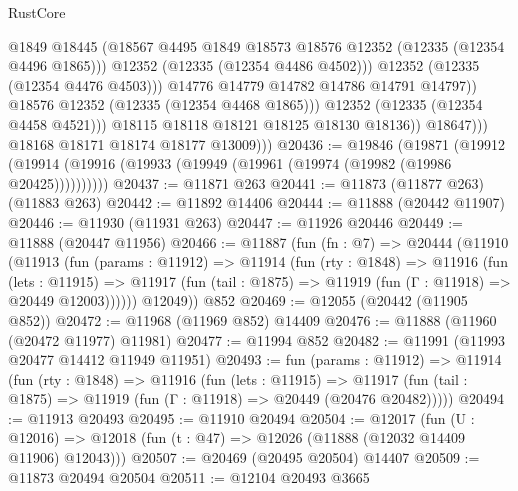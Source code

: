 \begin{lexlean}{RustCore}
\begin{coremodule}
                                @1849
                                @18445
                                (@18567
                                  @4495
                                  @1849
                                  @18573
                                  @18576
                                  @12352
                                  (@12335 (@12354 @4496 @1865)))
                                @12352
                                (@12335 (@12354 @4486 @4502)))
                              @12352
                              (@12335 (@12354 @4476 @4503)))
                            @14776
                            @14779
                            @14782
                            @14786
                            @14791
                            @14797))
                        @18576
                        @12352
                        (@12335 (@12354 @4468 @1865)))
                      @12352
                      (@12335 (@12354 @4458 @4521)))
                    @18115
                    @18118
                    @18121
                    @18125
                    @18130
                    @18136))
                @18647)))
          @18168
          @18171
          @18174
          @18177
          @13009)))
@20436 := @19846
    (@19871 (@19912 (@19914 (@19916 (@19933 (@19949 (@19961 (@19974 (@19982 (@19986 @20425))))))))))
@20437 := @11871 @263
@20441 := @11873 (@11877 @263) (@11883 @263)
@20442 := @11892 @14406
@20444 := @11888 (@20442 @11907)
@20446 := @11930 (@11931 @263)
@20447 := @11926 @20446
@20449 := @11888 (@20447 @11956)
@20466 := @11887
    (fun (fn : @7) =>
    @20444
      (@11910
        (@11913
          (fun (params : @11912) =>
          @11914
            (fun (rty : @1848) =>
            @11916
              (fun (lets : @11915) =>
              @11917 (fun (tail : @1875) => @11919 (fun (Γ : @11918) => @20449 @12003))))))
        @12049))
    @852
@20469 := @12055 (@20442 (@11905 @852))
@20472 := @11968 (@11969 @852) @14409
@20476 := @11888 (@11960 (@20472 @11977) @11981)
@20477 := @11994 @852
@20482 := @11991 (@11993 @20477 @14412 @11949 @11951)
@20493 := fun (params : @11912) =>
  @11914
    (fun (rty : @1848) =>
    @11916
      (fun (lets : @11915) =>
      @11917 (fun (tail : @1875) => @11919 (fun (Γ : @11918) => @20449 (@20476 @20482)))))
@20494 := @11913 @20493
@20495 := @11910 @20494
@20504 := @12017
    (fun (U : @12016) => @12018 (fun (t : @47) => @12026 (@11888 (@12032 @14409 @11906) @12043)))
@20507 := @20469 (@20495 @20504) @14407
@20509 := @11873 @20494 @20504
@20511 := @12104 @20493 @3665

\end{coremodule}
\end{lexlean}
